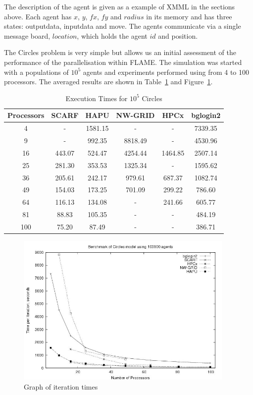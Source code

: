 The description of the agent is given as a example of XMML in the sections above. Each agent has $x$, $y$, $fx$, $fy$ and $radius$ in its memory and has three states: outputdata, inputdata and move. The agents communicate via a single message board, $location$, which holds the agent $id$ and position.

The Circles problem is very simple but allows us an initial assessment of the performance of the parallelisation within FLAME. The simulation was started with a populations of $10^5$  agents and experiments performed using from 4 to 100 processors. The averaged results are shown in Table~\ref{tab:ExecutionTimesForCircles} and Figure~\ref{fig:Circles-graph}.
{
\renewcommand{\arraystretch}{1.25}
\begin{table}[ht]
 \centering
  \begin{tabular}{c|ccccc}
 Processors &SCARF  &HAPU  &NW-GRID &HPCx  &bglogin2 \\ \hline
 4   &-   &1581.15  & -   & -    &7339.35  \\
 9   &-   &992.35   &8818.49  &-   &4530.96  \\
 16   &443.07   &524.47   &4254.44  &1464.85  &2507.14  \\
 25   &281.30   &353.53   &1325.34  &-   &1595.62  \\
 36   &205.61   &242.17   &979.61   &687.37   &1082.74  \\
 49   &154.03   &173.25   &701.09   &299.22   &786.60   \\
 64   &116.13   &134.08   &-   &241.66   &605.77   \\
 81   &88.83   &105.35   &-   &-   &484.19   \\
 100   &75.20   &87.49   &-   &-   &386.71   \\
 \end{tabular}
 \caption{Execution Times for $10^5$ Circles}
 \label{tab:ExecutionTimesForCircles}
\end{table}
}
\begin{figure}[ht]
 \centering
  \includegraphics[width=300pt]{Circles-graph.jpg}
 \caption{Graph of iteration times}
 \label{fig:Circles-graph}
\end{figure}

